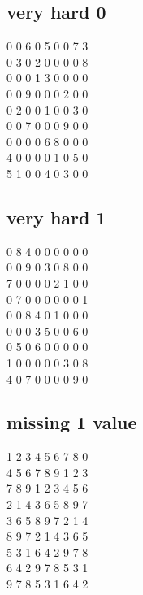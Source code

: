 \documentclass[11pt]{report}
\begin{document}
        \subsection{very hard 0} \label{sec:vhard0}
            0 0 6 0 5 0 0 7 3\\
            0 3 0 2 0 0 0 0 8\\
            0 0 0 1 3 0 0 0 0\\
            0 0 9 0 0 0 2 0 0\\
            0 2 0 0 1 0 0 3 0\\
            0 0 7 0 0 0 9 0 0\\
            0 0 0 0 6 8 0 0 0\\
            4 0 0 0 0 1 0 5 0\\
            5 1 0 0 4 0 3 0 0\\

        \subsection{very hard 1} \label{sec:vhard1}
            0 8 4 0 0 0 0 0 0\\
            0 0 9 0 3 0 8 0 0\\
            7 0 0 0 0 2 1 0 0\\
            0 7 0 0 0 0 0 0 1\\
            0 0 8 4 0 1 0 0 0\\
            0 0 0 3 5 0 0 6 0\\
            0 5 0 6 0 0 0 0 0\\
            1 0 0 0 0 0 3 0 8\\
            4 0 7 0 0 0 0 9 0\\

        \subsection{missing 1 value} \label{sec:miss}
            1 2 3 4 5 6 7 8 0\\
            4 5 6 7 8 9 1 2 3\\
            7 8 9 1 2 3 4 5 6\\
            2 1 4 3 6 5 8 9 7\\
            3 6 5 8 9 7 2 1 4\\
            8 9 7 2 1 4 3 6 5\\
            5 3 1 6 4 2 9 7 8\\
            6 4 2 9 7 8 5 3 1\\
            9 7 8 5 3 1 6 4 2\\
        
\end{document}
